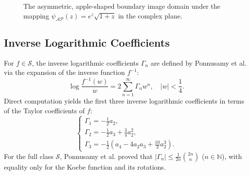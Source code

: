 \documentclass[11pt]{article}
\numberwithin{equation}{section}
\begin{document}
\begin{figure}[htbp]
\centering
{}
\caption{The asymmetric, apple-shaped boundary image domain under the mapping $\psi_{\mathcal{AP}}(z) = e^z\sqrt{1+z}$ in the complex plane.}
\label{fig:apple_domain_region}
\end{figure}
\subsection{Inverse Logarithmic Coefficients}
For $f\in\mathcal{S}$, the inverse logarithmic coefficients $\Gamma_n$ are defined by Ponnusamy et al. \cite{Ponnusamy2018} via the expansion of the inverse function $f^{-1}$:
\[
\log\frac{f^{-1}(w)}{w} = 2\sum_{n=1}^{\infty}\Gamma_n w^n, \quad |w|<\frac{1}{4}.
\]
Direct computation yields the first three inverse logarithmic coefficients in terms of the Taylor coefficients of $f$:
\begin{equation}\label{IG1}
\begin{cases}
\Gamma_1 = -\frac{1}{2} a_2, \\
\Gamma_2 = -\frac{1}{2} a_3 + \frac{3}{4} a_2^2, \\
\Gamma_3 = -\frac{1}{2} \left( a_4 - 4a_2 a_3 + \frac{10}{3} a_2^3 \right).
\end{cases}
\end{equation}
For the full class $\mathcal{S}$, Ponnusamy et al. \cite{Ponnusamy2018} proved that $|\Gamma_n| \le \frac{1}{2n}\binom{2n}{n}$ ($n\in\mathbb{N}$), with equality only for the Koebe function and its rotations.
\end{document}
